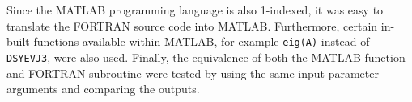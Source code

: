 Since the MATLAB programming language is also 1-indexed, it was easy to translate the FORTRAN source code into MATLAB. Furthermore, certain in-built functions available within MATLAB, for example \texttt{eig(A)} instead of \texttt{DSYEVJ3}, were also used. Finally, the equivalence of both the MATLAB function and FORTRAN subroutine were tested by using the same input parameter arguments and comparing the outputs. 